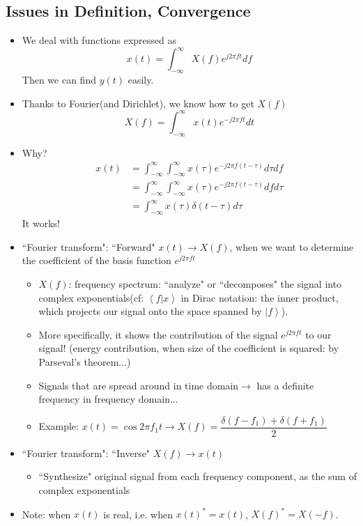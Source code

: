 \documentclass{article}
\begin{document}
\subsection{Issues in Definition, Convergence}
\begin{itemize}
\item We deal with functions expressed as
\[
x(t)=\int_{-\infty}^{\infty}{X(f)e^{j2\pi ft}df}
\]
Then we can find $y(t)$ easily.
\item Thanks to Fourier(and Dirichlet), we know how to get $X(f)$
\[
X(f)=\int_{-\infty}^{\infty}{x(t)e^{-j2\pi ft}dt}
\]
\item Why?
\begin{align*}
x(t)&=\int_{-\infty}^{\infty}{\int_{-\infty}^{\infty}{x(\tau)e^{-j2\pi f(t-\tau)}d\tau}df}\\
&=\int_{-\infty}^{\infty}{\int_{-\infty}^{\infty}{x(\tau)e^{-j2\pi f(t-\tau)}df}d\tau}\\
&=\int_{-\infty}^{\infty}{x(\tau)\delta(t-\tau)d\tau}
\end{align*}
It works!
\item ``Fourier transform": ``Forward" $x(t)\rightarrow X(f)$, when we want to determine the coefficient of the basis function $e^{j2\pi ft}$
\begin{itemize}
\item $X(f)$: frequency spectrum: ``analyze" or ``decomposes" the signal into complex exponentials(cf: $\left<f|x\right>$ in Dirac notation: the inner product, which projects our signal onto the space spanned by $\left|f\right>$).
\item More specifically, it shows the contribution of the signal $e^{j2\pi ft}$ to our signal! (energy contribution, when size of the coefficient is squared: by Parseval's theorem...)
\item Signals that are spread around in time domain$\rightarrow$ has a definite frequency in frequency domain...
\item Example: $x(t)=\cos{2\pi f_1t}\rightarrow X(f)=\dfrac{\delta(f-f_1)+\delta(f+f_1)}{2}$
\end{itemize}
\item ``Fourier transform": ``Inverse" $X(f)\rightarrow x(t)$
\begin{itemize}
\item ``Synthesize" original signal from each frequency component, as the sum of complex exponentials
\end{itemize}
\item Note: when $x(t)$ is real, i.e. when $x(t)^*=x(t)$, $X(f)^*=X(-f)$.
\end{itemize}
\end{document}
